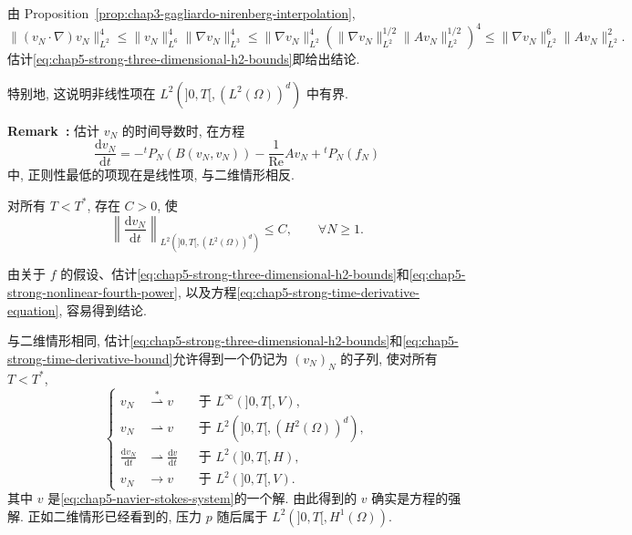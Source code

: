 \begin{Proof}
由 Proposition~\ref{prop:chap3-gagliardo-nirenberg-interpolation},
\[
 \|(v_N\cdot\nabla)v_N\|_{L^2}^4
 \leq\|v_N\|_{L^6}^4\|\nabla v_N\|_{L^3}^4
 \leq\|\nabla v_N\|_{L^2}^4
 \left(\|\nabla v_N\|_{L^2}^{1/2}\|Av_N\|_{L^2}^{1/2}\right)^4
 \leq\|\nabla v_N\|_{L^2}^6\|Av_N\|_{L^2}^2.
\]
估计\eqref{eq:chap5-strong-three-dimensional-h2-bounds}即给出结论.
\end{Proof}

特别地, 这说明非线性项在 $L^2(]0,T[,(L^2(\Omega))^d)$ 中有界.

\par\noindent{}\textbf{Remark~\thechapterfivesectiontworemark:}\label{rem:chap5-strong-linear-lowest-regularity}
估计 $v_N$ 的时间导数时, 在方程
\begin{equation}
 \frac{\mathrm dv_N}{\mathrm dt}
 =-{}^tP_N(B(v_N,v_N))-\frac1{\operatorname{Re}}Av_N+{}^tP_N(f_N)
\label{eq:chap5-strong-time-derivative-equation}
\end{equation}
中, 正则性最低的项现在是线性项, 与二维情形相反.

\begin{Proposition}
\label{prop:chap5-strong-time-derivative-l2}
对所有 $T<T^*$, 存在 $C>0$, 使
\begin{equation}
 \left\|\frac{\mathrm dv_N}{\mathrm dt}\right\|_{L^2(]0,T[,(L^2(\Omega))^d)}
 \leq C,
 \qquad\forall N\geq1.
\label{eq:chap5-strong-time-derivative-bound}
\end{equation}
\end{Proposition}

\begin{Proof}
由关于 $f$ 的假设、估计\eqref{eq:chap5-strong-three-dimensional-h2-bounds}和\eqref{eq:chap5-strong-nonlinear-fourth-power}, 以及方程\eqref{eq:chap5-strong-time-derivative-equation}, 容易得到结论.
\end{Proof}

与二维情形相同, 估计\eqref{eq:chap5-strong-three-dimensional-h2-bounds}和\eqref{eq:chap5-strong-time-derivative-bound}允许得到一个仍记为 $(v_N)_N$ 的子列, 使对所有 $T<T^*$,
\[
 \left\{
 \begin{aligned}
 v_N&\stackrel{*}{\rightharpoonup}v&&\text{于 }L^\infty(]0,T[,V),\\
 v_N&\rightharpoonup v&&\text{于 }L^2(]0,T[,(H^2(\Omega))^d),\\
 \frac{\mathrm dv_N}{\mathrm dt}&\rightharpoonup\frac{\mathrm dv}{\mathrm dt}&&\text{于 }L^2(]0,T[,H),\\
 v_N&\longrightarrow v&&\text{于 }L^2(]0,T[,V).
 \end{aligned}
 \right.
\]
其中 $v$ 是\eqref{eq:chap5-navier-stokes-system}的一个解. 由此得到的 $v$ 确实是方程的强解. 正如二维情形已经看到的, 压力 $p$ 随后属于 $L^2(]0,T[,H^1(\Omega))$.

